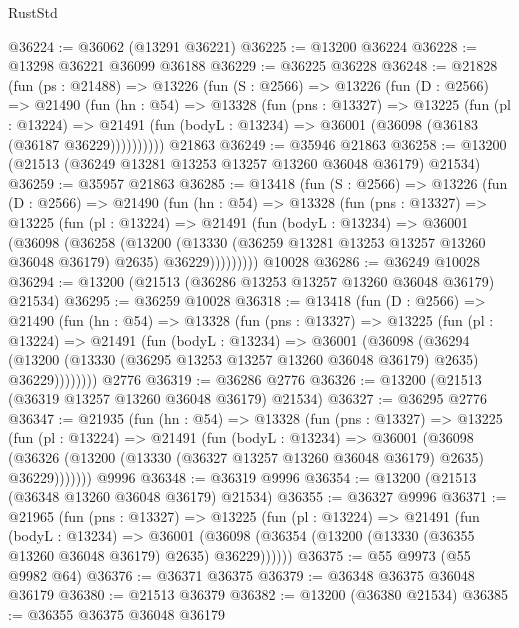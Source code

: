 \begin{lexlean}{RustStd}
\begin{coremodule}
@36224 := @36062 (@13291 @36221)
@36225 := @13200 @36224
@36228 := @13298 @36221 @36099 @36188
@36229 := @36225 @36228
@36248 := @21828
    (fun (ps : @21488) =>
    @13226
      (fun (S : @2566) =>
      @13226
        (fun (D : @2566) =>
        @21490
          (fun (hn : @54) =>
          @13328
            (fun (pns : @13327) =>
            @13225
              (fun (pl : @13224) =>
              @21491 (fun (bodyL : @13234) => @36001 (@36098 (@36183 (@36187 @36229))))))))))
    @21863
@36249 := @35946 @21863
@36258 := @13200 (@21513 (@36249 @13281 @13253 @13257 @13260 @36048 @36179) @21534)
@36259 := @35957 @21863
@36285 := @13418
    (fun (S : @2566) =>
    @13226
      (fun (D : @2566) =>
      @21490
        (fun (hn : @54) =>
        @13328
          (fun (pns : @13327) =>
          @13225
            (fun (pl : @13224) =>
            @21491
              (fun (bodyL : @13234) =>
              @36001
                (@36098
                  (@36258
                    (@13200
                      (@13330 (@36259 @13281 @13253 @13257 @13260 @36048 @36179) @2635)
                      @36229)))))))))
    @10028
@36286 := @36249 @10028
@36294 := @13200 (@21513 (@36286 @13253 @13257 @13260 @36048 @36179) @21534)
@36295 := @36259 @10028
@36318 := @13418
    (fun (D : @2566) =>
    @21490
      (fun (hn : @54) =>
      @13328
        (fun (pns : @13327) =>
        @13225
          (fun (pl : @13224) =>
          @21491
            (fun (bodyL : @13234) =>
            @36001
              (@36098
                (@36294
                  (@13200 (@13330 (@36295 @13253 @13257 @13260 @36048 @36179) @2635) @36229))))))))
    @2776
@36319 := @36286 @2776
@36326 := @13200 (@21513 (@36319 @13257 @13260 @36048 @36179) @21534)
@36327 := @36295 @2776
@36347 := @21935
    (fun (hn : @54) =>
    @13328
      (fun (pns : @13327) =>
      @13225
        (fun (pl : @13224) =>
        @21491
          (fun (bodyL : @13234) =>
          @36001
            (@36098
              (@36326 (@13200 (@13330 (@36327 @13257 @13260 @36048 @36179) @2635) @36229)))))))
    @9996
@36348 := @36319 @9996
@36354 := @13200 (@21513 (@36348 @13260 @36048 @36179) @21534)
@36355 := @36327 @9996
@36371 := @21965
    (fun (pns : @13327) =>
    @13225
      (fun (pl : @13224) =>
      @21491
        (fun (bodyL : @13234) =>
        @36001 (@36098 (@36354 (@13200 (@13330 (@36355 @13260 @36048 @36179) @2635) @36229))))))
@36375 := @55 @9973 (@55 @9982 @64)
@36376 := @36371 @36375
@36379 := @36348 @36375 @36048 @36179
@36380 := @21513 @36379
@36382 := @13200 (@36380 @21534)
@36385 := @36355 @36375 @36048 @36179

\end{coremodule}
\end{lexlean}
